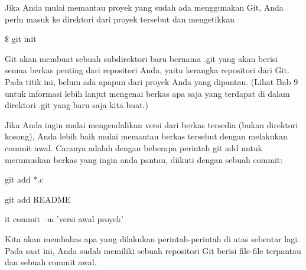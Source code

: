  \par
\noindent 
{\fontsize{14pt}{14pt}\selectfont Jika Anda mulai memantau proyek yang sudah ada menggunakan Git, Anda perlu masuk ke direktori dari proyek tersebut dan mengetikkan \\} \par
\noindent 
{\fontsize{14pt}{14pt}\selectfont  $  \$  $ git init \\} \par
\noindent 
{\fontsize{14pt}{14pt}\selectfont Git akan membuat sebuah subdirektori baru bernama .git yang akan berisi semua berkas penting dari repositori Anda, yaitu kerangka repositori dari Git. Pada titik ini, belum ada apapun dari proyek Anda yang dipantau. (Lihat Bab 9 untuk informasi lebih lanjut mengenai berkas apa saja yang terdapat di dalam direktori $  $.git $  $yang baru saja kita buat.) \\} \par
\noindent 
{\fontsize{14pt}{14pt}\selectfont Jika Anda ingin mulai mengendalikan versi dari berkas tersedia (bukan direktori kosong), Anda lebih baik mulai memantau berkas tersebut dengan melakukan commit awal. Caranya adalah dengan beberapa perintah $  $git add $  $untuk merumuskan berkas yang ingin anda pantau, diikuti dengan sebuah commit: \\} \par
\noindent 
{\fontsize{14pt}{14pt}\selectfont git add *.c \\} \par
\noindent 
{\fontsize{14pt}{14pt}\selectfont git add README \\} \par
\noindent 
{\fontsize{14pt}{14pt}\selectfont it commit –m 'versi awal proyek' \\} \par
\noindent 
{\fontsize{14pt}{14pt}\selectfont Kita akan membahas apa yang dilakukan perintah-perintah di atas sebentar lagi. Pada saat ini, Anda sudah memiliki sebuah repositori Git berisi file-file terpantau dan sebuah commit awal. \\} \par


